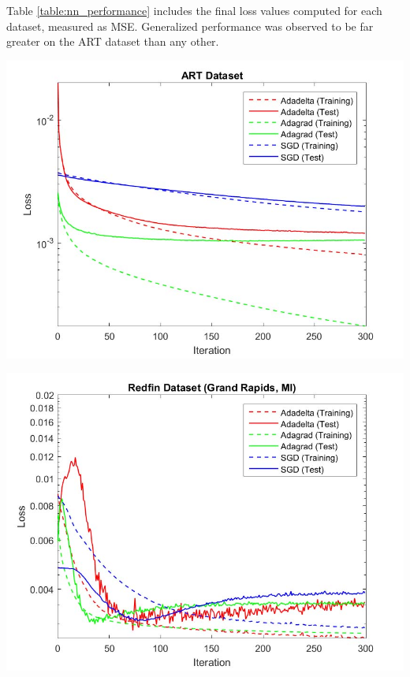 \documentclass[10pt]{article}
\begin{document}
\begin{multicols}{2}
		Table \ref{table:nn_performance} includes the final loss values computed for each dataset, measured as MSE. Generalized performance was observed to be far greater on the ART dataset than any other.
		\begin{center}
            \captionsetup{type=figure}
			\includegraphics[scale=0.27]{NeuralNet/fig_nn_02} \\
			\label{fig:fig_nn_result1}
		\end{center}
	
		\begin{center}
            \captionsetup{type=figure}
			\includegraphics[scale=0.27]{NeuralNet/fig_nn_03} \\
			\label{fig:fig_nn_result2}
		\end{center}


\end{multicols}
\end{document}
